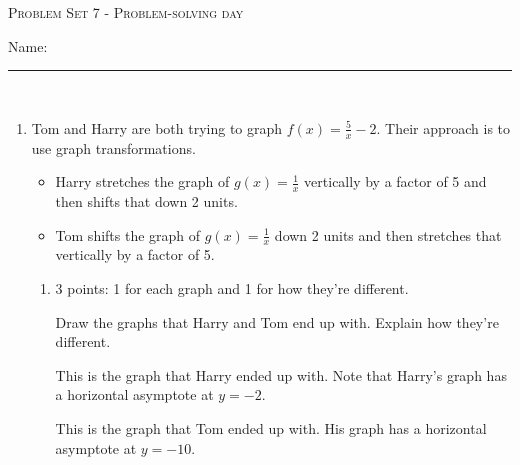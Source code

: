 \documentclass{article}
\begin{document}
\begin{center}
  \large\textsc{Problem Set 7 - Problem-solving day}\vspace{.5in}
  
   \large Name: \rule{5cm}{0.15mm}\\
\end{center}


\begin{enumerate}
\item  Tom and Harry are both trying to graph $f(x) = \frac{5}{x} -2$. Their approach is to use graph transformations.
  \begin{itemize} 
  \item Harry stretches the graph of $g(x)=\frac{1}{x}$ vertically by a factor of 5 and then shifts that down 2 units.
  \item Tom shifts the graph of $g(x) = \frac{1}{x}$ down 2 units and then stretches that vertically by a factor of 5.
  \end{itemize}   

  \begin{enumerate} 
  \item

    \begin{grading}
      3 points: 1 for each graph and 1 for how they're different.
    \end{grading}

    \begin{problem}[\vfill]
      Draw the graphs that Harry and Tom end up with. Explain how they're different.
    \end{problem}

    \begin{solution} 
      This is the graph that Harry ended up with. Note that Harry's graph has a horizontal asymptote at $y=-2$.
      \begin{center}
      \end{center}
      This is the graph that Tom ended up with. His graph has a horizontal asymptote at $y=-10$.
      \begin{center}
      \end{center}
    \end{solution} 


\end{enumerate}
\end{enumerate}
\end{document}
